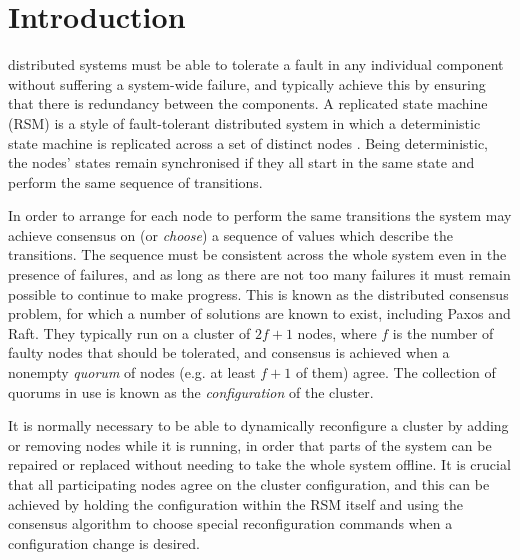 \documentclass[journal]{IEEEtran}
\begin{document}
%
\IEEEpeerreviewmaketitle

\section{Introduction}

 distributed systems must be able to tolerate a fault
in any individual component without suffering a system-wide failure, and
typically achieve this by ensuring that there is redundancy between the
components.  A replicated state machine (RSM) is a style of fault-tolerant
distributed system in which a deterministic state machine is replicated across
a set of distinct nodes \cite{lampson}. Being deterministic, the nodes' states
remain synchronised if they all start in the same state and perform the same
sequence of transitions.

In order to arrange for each node to perform the same transitions the system
may achieve consensus on (or \textit{choose}) a sequence of values which
describe the transitions. The sequence must be consistent across the whole
system even in the presence of failures, and as long as there are not too many
failures it must remain possible to continue to make progress.  This is known
as the distributed consensus problem, for which a number of solutions are known
to exist, including Paxos \cite{part-time-parliament} and Raft\cite{raft}. They
typically run on a cluster of $2f+1$ nodes, where $f$ is the number of faulty
nodes that should be tolerated, and consensus is achieved when a nonempty
\textit{quorum} of nodes (e.g. at least $f+1$ of them) agree.  The collection
of quorums in use is known as the \textit{configuration} of the cluster.

It is normally necessary to be able to dynamically reconfigure a cluster by
adding or removing nodes while it is running, in order that parts of the system
can be repaired or replaced without needing to take the whole system offline.
It is crucial that all participating nodes agree on the cluster configuration,
and this can be achieved by holding the configuration within the RSM itself and
using the consensus algorithm to choose special reconfiguration commands when a
configuration change is desired.
\end{document}
